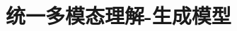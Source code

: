 \setcounter{chapter}{28}

\hypertarget{ux7edfux4e00ux591aux6a21ux6001ux7406ux89e3-ux751fux6210ux6a21ux578b}{%
\chapter{统一多模态理解-生成模型}\label{ux7edfux4e00ux591aux6a21ux6001ux7406ux89e3-ux751fux6210ux6a21ux578b}}
